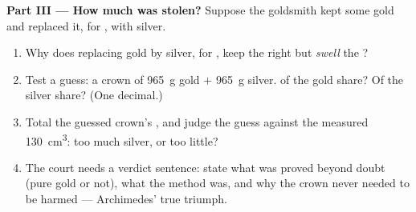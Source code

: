 \begin{problem}
\medskip\noindent\textbf{Part III --- How much was stolen?}
Suppose the goldsmith kept some gold and replaced it,  for
, with silver.
\begin{enumerate}[resume]
  \item Why does replacing gold by silver,  for , keep
        the  right but \emph{swell} the ?
  \item Test a guess: a crown of \qty{965}{g} gold $+$
        \qty{965}{g} silver.  of the gold share? Of the
        silver share? (One decimal.)
  \item Total the guessed crown's , and judge the guess
        against the measured \qty{130}{cm^3}: too much silver, or
        too little?
  \item The court needs a verdict sentence: state what was
        proved beyond doubt (pure gold or not), what the method
        was, and why the crown never needed to be harmed ---
        Archimedes' true triumph.
\end{enumerate}
\end{problem}
